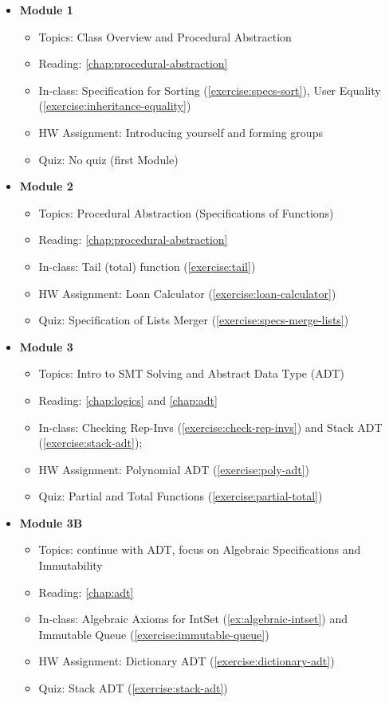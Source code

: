 \documentclass[oneside,11pt,dvipsnames]{book}
\begin{document}
\begin{itemize}
    \item \textbf{Module 1}
    \begin{itemize}
        \item Topics: Class Overview and Procedural Abstraction
        \item Reading: \autoref{chap:procedural-abstraction}
        \item In-class: Specification for Sorting (\autoref{exercise:specs-sort}), User Equality (\autoref{exercise:inheritance-equality})
        \item HW Assignment: Introducing yourself and forming groups
        \item Quiz: No quiz (first Module)
    \end{itemize}

    \item \textbf{Module 2}
    \begin{itemize}
        \item Topics: Procedural Abstraction (Specifications of Functions)
        \item Reading: \autoref{chap:procedural-abstraction}
        \item In-class: Tail (total) function (\autoref{exercise:tail})
        \item HW Assignment: Loan Calculator (\autoref{exercise:loan-calculator})
        \item Quiz: Specification of Lists Merger (\autoref{exercise:specs-merge-lists})
    \end{itemize}

    \item \textbf{Module 3}
    \begin{itemize}
        \item Topics: Intro to SMT Solving and Abstract Data Type (ADT)
        \item Reading: \autoref{chap:logics} and \autoref{chap:adt}
        \item In-class: Checking Rep-Invs (\autoref{exercise:check-rep-invs}) and Stack ADT (\autoref{exercise:stack-adt}); 
        \item HW Assignment: Polynomial ADT (\autoref{exercise:poly-adt})
        \item Quiz: Partial and Total Functions (\autoref{exercise:partial-total})
    \end{itemize}

    \item \textbf{Module 3B}
    \begin{itemize}
        \item Topics: continue with ADT, focus on Algebraic Specifications and Immutability
        \item Reading: \autoref{chap:adt}
        \item In-class: Algebraic Axioms for IntSet (\autoref{ex:algebraic-intset}) and Immutable Queue (\autoref{exercise:immutable-queue}) 
        \item HW Assignment: Dictionary ADT (\autoref{exercise:dictionary-adt})
        \item Quiz: Stack ADT (\autoref{exercise:stack-adt})
    \end{itemize}



\end{itemize}
\end{document}
